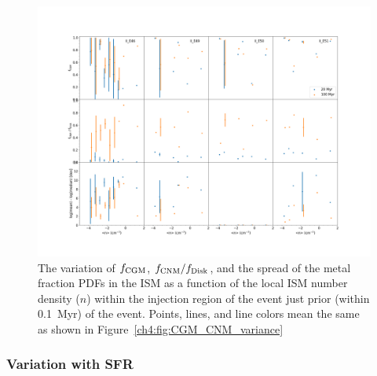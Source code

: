  \begin{figure}
   \centering
   \includegraphics[width=0.95\linewidth]{figures/ch4/II_n_dependence}
   \caption{The variation of $f_{\rm CGM}$, $f_{\rm CNM} / f_{\rm Disk}$, and the spread of the metal fraction PDFs in the ISM as a function of the local ISM number density ($n$) within the injection region of the event just prior (within 0.1~Myr) of the event. Points, lines, and line colors mean the same as shown in Figure~\ref{ch4:fig:CGM_CNM_variance}}
   \label{ch4:fig:ISM_variance}
 \end{figure}


\subsubsection{Variation with SFR}
\label{ch4:sec:SFR}

